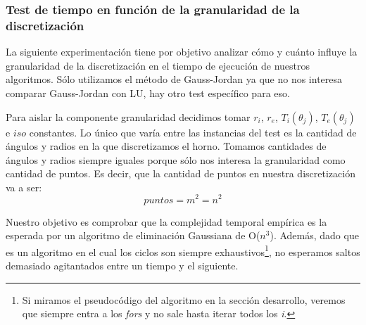 \subsubsection{Test de tiempo en función de la granularidad de la discretización}
La siguiente experimentación tiene por objetivo analizar cómo y cuánto influye la granularidad de la
discretización en el tiempo de ejecución de nuestros algoritmos. Sólo utilizamos el método de
Gauss-Jordan ya que no nos interesa comparar Gauss-Jordan con LU, hay otro test específico para eso.

Para aislar la componente granularidad decidimos tomar $r_i$, $r_e$, $T_i(\theta_j)$,
$T_e(\theta_j)$ e $iso$ constantes. Lo único que varía entre las instancias del test es la cantidad
de ángulos y radios en la que discretizamos el horno. Tomamos cantidades de ángulos y radios siempre
iguales porque sólo nos interesa la granularidad como cantidad de puntos. Es decir, que la cantidad
de puntos en nuestra discretización va a ser:
\begin{equation}
 puntos = m^2 = n^2
\end{equation}

Nuestro objetivo es comprobar que la complejidad temporal empírica es la esperada por un algoritmo
de eliminación Gaussiana de O($n^3$). Además, dado que es un algoritmo en el cual los ciclos son
siempre exhaustivos\footnote{Si miramos el pseudocódigo del algoritmo en la sección desarrollo,
veremos que siempre entra a los \textit{fors} y no sale hasta iterar todos los \textit{i}.}, no esperamos saltos
demasiado agitantados entre un tiempo y el siguiente.
